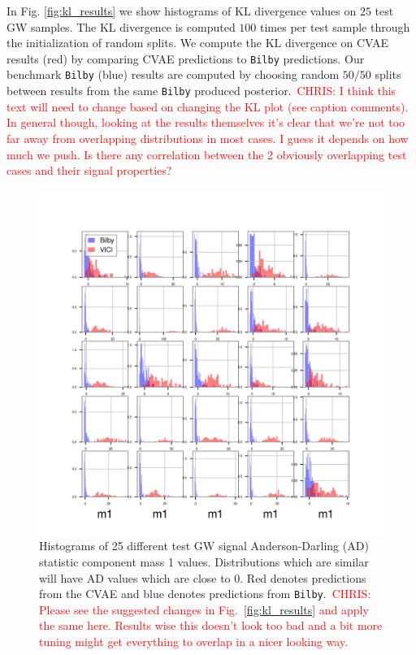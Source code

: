 \documentclass[%
showpacs,
 amsmath,amssymb,
 aps,
 twocolumn,
 prl,
 reprint,
floatfix,
]{revtex4-1}
\newcommand{\chris}[1]{\textcolor{red}{CHRIS: #1}}
\begin{document}
In Fig. \ref{fig:kl_results} we show histograms of KL divergence values on $25$
test GW samples. The KL divergence is computed $100$ times per test sample
through the initialization of random splits. We compute the KL divergence on
\ac{CVAE} results (red) by comparing \ac{CVAE} predictions to \texttt{Bilby}
predictions. Our benchmark \texttt{Bilby} (blue) results are computed by
choosing random $50/50$ splits between results from the same \texttt{Bilby}
produced posterior.~\chris{I think this text will need to change based on
changing the KL plot (see caption comments). In general though, looking at the
results themselves it's clear that we're not too far away from overlapping
distributions in most cases. I guess it depends on how much we push. Is there
any correlation between the 2 obviously overlapping test cases and their signal
properties?}


%
%
\begin{figure}
    \includegraphics[width=\columnwidth]{images/hist-ad_0.png}
    \caption{\label{fig:ad_results} Histograms of 25 different test GW signal
Anderson-Darling (AD) statistic component mass 1 values. Distributions which
are similar will have AD values which are close to 0.  Red denotes predictions
from the \ac{CVAE} and blue denotes predictions from
\texttt{Bilby}.~\chris{Please see the suggested changes in
Fig.~\ref{fig:kl_results} and apply the same here. Results wise this doesn't
look too bad and a bit more tuning might get everything to overlap in a nicer
looking way.}}
\end{figure}
\end{document}

